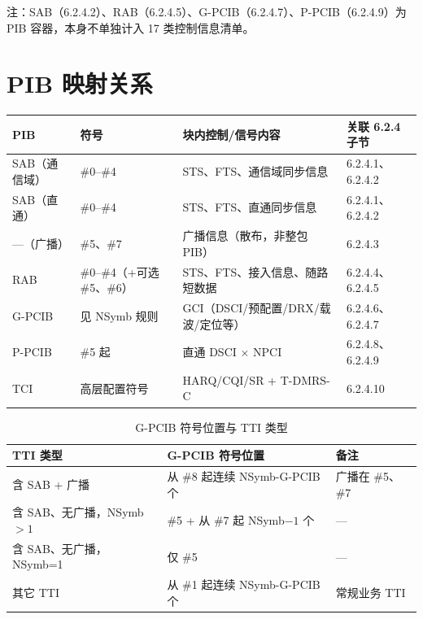 \documentclass[11pt,a4paper]{ctexart}
\begin{document}
注：SAB（6.2.4.2）、RAB（6.2.4.5）、G-PCIB（6.2.4.7）、P-PCIB（6.2.4.9）为 PIB 容器，本身不单独计入 17 类控制信息清单。

\section{PIB 映射关系}

\begin{table}[h]
\centering
\footnotesize
\begin{tabular}{p{2.2cm}p{1.8cm}p{5.5cm}p{4cm}}
\toprule
\textbf{PIB} & \textbf{符号} & \textbf{块内控制/信号内容} & \textbf{关联 6.2.4 子节} \\
\midrule
SAB（通信域） & \#0--\#4 & STS、FTS、通信域同步信息 & 6.2.4.1、6.2.4.2 \\
SAB（直通） & \#0--\#4 & STS、FTS、直通同步信息 & 6.2.4.1、6.2.4.2 \\
---（广播） & \#5、\#7 & 广播信息（散布，非整包 PIB） & 6.2.4.3 \\
RAB & \#0--\#4（+可选 \#5、\#6） & STS、FTS、接入信息、随路短数据 & 6.2.4.4、6.2.4.5 \\
G-PCIB & 见 NSymb 规则 & GCI（DSCI/预配置/DRX/载波/定位等） & 6.2.4.6、6.2.4.7 \\
P-PCIB & \#5 起 & 直通 DSCI $\times$ NPCI & 6.2.4.8、6.2.4.9 \\
TCI & 高层配置符号 & HARQ/CQI/SR + T-DMRS-C & 6.2.4.10 \\
\bottomrule
\end{tabular}
\end{table}

\begin{table}[h]
\centering
\small
\caption{G-PCIB 符号位置与 TTI 类型}
\begin{tabular}{lll}
\toprule
\textbf{TTI 类型} & \textbf{G-PCIB 符号位置} & \textbf{备注} \\
\midrule
含 SAB + 广播 & 从 \#8 起连续 NSymb-G-PCIB 个 & 广播在 \#5、\#7 \\
含 SAB、无广播，NSymb$>1$ & \#5 + 从 \#7 起 NSymb$-1$ 个 & --- \\
含 SAB、无广播，NSymb=1 & 仅 \#5 & --- \\
其它 TTI & 从 \#1 起连续 NSymb-G-PCIB 个 & 常规业务 TTI \\
\bottomrule
\end{tabular}
\end{table}
\end{document}
